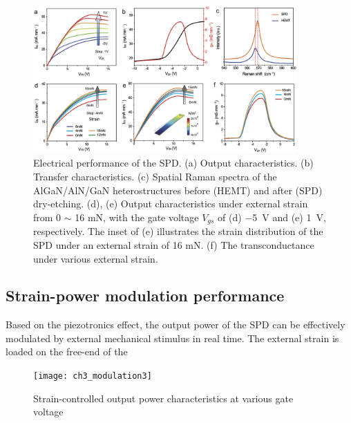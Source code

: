 \begin{figure}[H] 
\centering    
\includegraphics[width=0.9\textwidth]{ch3_performance}
\caption[Electrical performance of the SPD]{Electrical performance of the SPD. (a) Output characteristics. (b) Transfer characteristics. (c) Spatial Raman spectra of the AlGaN/AlN/GaN heterostructures before (HEMT) and after (SPD) dry-etching. (d), (e) Output characteristics under external strain from 0 $\sim$ 16 \unit{\mN}, with the gate voltage $V_{gs}$ of (d) \SI{-5}{\volt} and (e) \SI{1}{\volt}, respectively. The inset of (e) illustrates the strain distribution of the SPD under an external strain of 16 \unit{\mN}. (f) The transconductance under various external strain.}
\label{fig3:performance}
\end{figure}

\subsection{Strain-power modulation performance}
\label{sec:Strain-power modulation}

Based  on  the piezotronics  effect, the  output power of the  SPD can be effectively modulated by external mechanical stimulus in real time. The external strain is loaded on the free-end of the

\begin{figure}[H] 
\centering    
\texttt{[image: ch3\_modulation3]}
\caption[Strain-controlled output power characteristics at various gate voltage]{Strain-controlled  output power characteristics at various gate  voltage}
\label{fig3:modulation3}
\end{figure}

